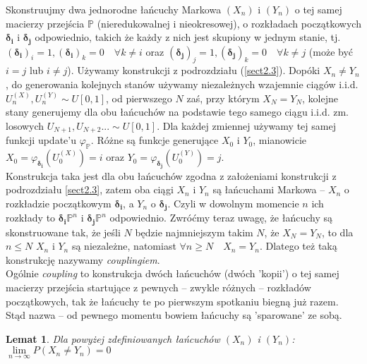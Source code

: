 \documentclass[a4paper]{article}
\theoremstyle{defn}
\theoremstyle{theorem}
\theoremstyle{lemma}
\newtheorem{lemma}[defn]{Lemat}
\theoremstyle{cor}
\theoremstyle{fact}
\begin{document}
Skonstruujmy dwa jednorodne łańcuchy Markowa $(X_n)$ i $(Y_n)$ o tej samej macierzy przejścia $\mathbb{P}$ (nieredukowalnej i nieokresowej), o rozkładach początkowych $\boldsymbol{\delta_i}$ i $\boldsymbol{\delta_j}$ odpowiednio, takich że każdy z nich jest skupiony w jednym stanie, tj. $(\boldsymbol{\delta_i})_i = 1, (\boldsymbol{\delta_i})_k = 0 \quad \forall k \neq i$ oraz $(\boldsymbol{\delta_j})_j = 1, (\boldsymbol{\delta_j})_k = 0 \quad \forall k \neq j$ (może być $i=j$ lub $i\neq j$). Używamy konstrukcji z podrozdziału (\ref{sect2.3}). Dopóki $X_n \neq Y_n$, do generowania kolejnych stanów używamy niezależnych wzajemnie ciągów i.i.d. $U_n^{(X)}, U_n^{(Y)} \sim U[0,1]$, od pierwszego $N$ zaś, przy którym $X_N = Y_N$, kolejne stany generujemy dla obu łańcuchów na podstawie tego samego ciągu i.i.d. zm. losowych $U_{N+1}, U_{N+2} ... \sim U[0,1]$. Dla każdej zmiennej używamy tej samej funkcji update'u $\varphi_{\mathbb{P}}$. Różne są funkcje generujące $X_0$ i $Y_0$, mianowicie $X_0 = \varphi_{\boldsymbol{\delta_i}}(U_0^{(X)}) = i$ oraz $Y_0 = \varphi_{\boldsymbol{\delta_j}}(U_0^{(Y)}) = j$.\\
Konstrukcja taka jest dla obu łańcuchów zgodna z założeniami konstrukcji z podrozdziału \ref{sect2.3}, zatem oba ciągi $X_n$ i $Y_n$ są łańcuchami Markowa – $X_n$ o rozkładzie początkowym $\boldsymbol{\delta_i}$, a $Y_n$ o $\boldsymbol{\delta_j}$. Czyli w dowolnym momencie $n$ ich rozkłady to $\boldsymbol{\delta_i}\mathbb{P}^n$ i $\boldsymbol{\delta_j}\mathbb{P}^n$ odpowiednio. Zwróćmy teraz uwagę, że łańcuchy są skonstruowane tak, że jeśli $N$ będzie najmniejszym takim $N$, że $X_N = Y_N$, to dla $n \leq N$ $X_n$ i $Y_n$ są niezależne, natomiast $\forall n \geq N \quad X_n = Y_n$. Dlatego też taką konstrukcję nazywamy \textit{couplingiem}.\\
Ogólnie \textit{coupling} to konstrukcja dwóch łańcuchów (dwóch 'kopii') o tej samej macierzy przejścia startujące z pewnych – zwykle różnych – rozkładów początkowych, tak że łańcuchy te po pierwszym spotkaniu biegną już razem. Stąd nazwa – od pewnego momentu bowiem łańcuchy są 'sparowane' ze sobą. 
\\
\begin{lemma}\label{lemma2.4.5}
Dla powyżej zdefiniowanych łańcuchów $(X_n)$ i $(Y_n)$: $\lim\limits_{n \to \infty} P(X_n \neq Y_n) = 0$
\end{lemma}
\end{document}

